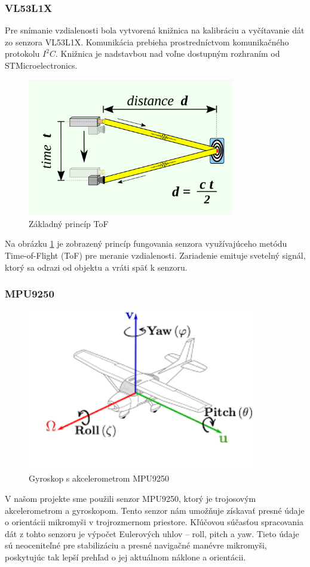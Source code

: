 \subsubsection{VL53L1X}
Pre snímanie vzdialenosti bola vytvorená knižnica na kalibráciu a vyčítavanie dát zo senzora VL53L1X. Komunikácia prebieha prostredníctvom komunikačného protokolu $I^2 C$. Knižnica je nadstavbou nad voľne dostupným rozhraním od STMicroelectronics.
\begin{figure}[!htpb]
    \centering
    \includegraphics[width=9cm]{includes//images/tof_pic.png}
    \caption{Základný princíp ToF}
    \label{fig:tof_pic}
\end{figure}
Na obrázku \ref{fig:tof_pic} je zobrazený princíp fungovania senzora využívajúceho metódu Time-of-Flight (ToF) pre meranie vzdialenosti. Zariadenie emituje svetelný signál, ktorý sa odrazi od objektu a vráti späť k senzoru.
\subsubsection{MPU9250}
\begin{figure}[!htpb]
    \centering
    \includegraphics[width=10cm]{includes//images/rpy.png}
    \caption{Gyroskop s akcelerometrom MPU9250 }
    \label{fig:rpy}
\end{figure}
V našom projekte sme použili senzor MPU9250, ktorý je trojosovým akcelerometrom a gyroskopom. Tento senzor nám umožňuje získavať presné údaje o orientácii mikromyši v trojrozmernom priestore. Kľúčovou súčasťou spracovania dát z tohto senzoru je výpočet Eulerových uhlov -- roll, pitch a yaw. Tieto údaje sú neoceniteľné pre stabilizáciu a presné navigačné manévre mikromyši, poskytujúc tak lepší prehľad o jej aktuálnom náklone a orientácii.

